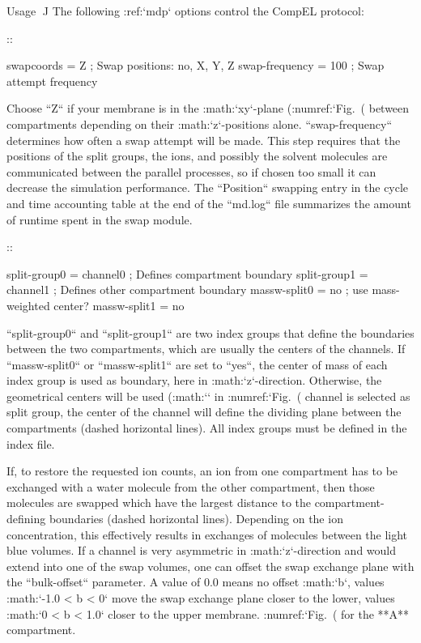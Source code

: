 Usage
^^^^^

The following :ref:`mdp` options control the CompEL protocol:

::

    swapcoords     = Z        ; Swap positions: no, X, Y, Z
    swap-frequency = 100      ; Swap attempt frequency

Choose ``Z`` if your membrane is in the :math:`xy`-plane
(:numref:`Fig. (%
between compartments depending on their :math:`z`-positions alone.
``swap-frequency`` determines how often a swap attempt will
be made. This step requires that the positions of the split groups, the
ions, and possibly the solvent molecules are communicated between the
parallel processes, so if chosen too small it can decrease the
simulation performance. The ``Position`` swapping entry in
the cycle and time accounting table at the end of the
``md.log`` file summarizes the amount of runtime spent in
the swap module.

::

    split-group0   = channel0 ; Defines compartment boundary
    split-group1   = channel1 ; Defines other compartment boundary
    massw-split0   = no       ; use mass-weighted center?
    massw-split1   = no

``split-group0`` and ``split-group1`` are two
index groups that define the boundaries between the two compartments,
which are usually the centers of the channels. If
``massw-split0`` or ``massw-split1`` are set to
``yes``, the center of mass of each index group is used as
boundary, here in :math:`z`-direction. Otherwise, the geometrical
centers will be used (:math:`\times` in
:numref:`Fig. (%
channel is selected as split group, the center of the channel will
define the dividing plane between the compartments (dashed horizontal
lines). All index groups must be defined in the index file.

If, to restore the requested ion counts, an ion from one compartment has
to be exchanged with a water molecule from the other compartment, then
those molecules are swapped which have the largest distance to the
compartment-defining boundaries (dashed horizontal lines). Depending on
the ion concentration, this effectively results in exchanges of
molecules between the light blue volumes. If a channel is very
asymmetric in :math:`z`-direction and would extend into one of the swap
volumes, one can offset the swap exchange plane with the
``bulk-offset`` parameter. A value of 0.0 means no offset
:math:`b`, values :math:`-1.0 < b < 0` move the swap exchange plane
closer to the lower, values :math:`0 < b < 1.0` closer to the upper
membrane. :numref:`Fig. (%
for the **A** compartment.

